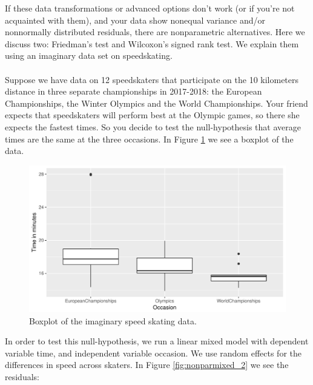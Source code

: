 \documentclass[]{report}\usepackage[]{graphicx}\usepackage[]{color}
\makeatletter
\def\maxwidth{ %
  \ifdim\Gin@nat@width>\linewidth
    \linewidth
  \else
    \Gin@nat@width
  \fi
}
\newenvironment{knitrout}{}{} %
\makeatother
\begin{document}
If these data transformations or advanced options don't work (or if you're not acquainted with them), and your data show nonequal variance and/or nonnormally distributed residuals, there are nonparametric alternatives.  Here we discuss two: Friedman's test and Wilcoxon's signed rank test. We explain them using an imaginary data set on speedskating.
\\
\\
Suppose we have data on 12 speedskaters that participate on the 10 kilometers distance in three separate championships in 2017-2018: the European Championships, the Winter Olympics and the World Championships. Your friend expects that speedskaters will perform best at the Olympic games, so there she expects the fastest times. So you decide to test the null-hypothesis that average times are the same at the three occasions. In Figure \ref{fig:nonparmixed_1} we see a boxplot of the data.



\begin{knitrout}
\color{fgcolor}\begin{figure}

{\centering \includegraphics[width=\maxwidth]{figure/nonparmixed_1-1} 

}

\caption[Boxplot of the imaginary speed skating data]{Boxplot of the imaginary speed skating data.}\label{fig:nonparmixed_1}
\end{figure}


\end{knitrout}

In order to test this null-hypothesis, we run a linear mixed model with dependent variable time, and independent variable occasion. We use random effects for the differences in speed across skaters. In Figure \ref{fig:nonparmixed_2} we see the residuals:
\end{document}
